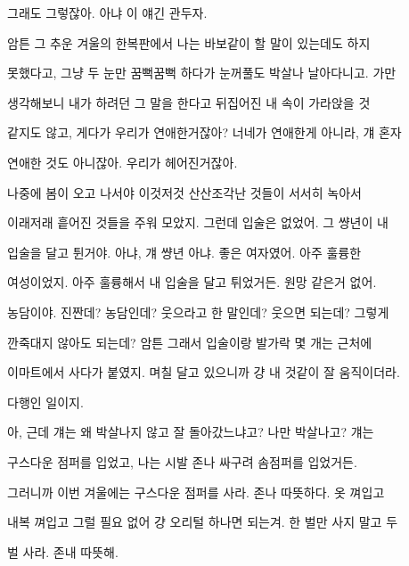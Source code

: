 그래도 그렇잖아. 아냐 이 얘긴 관두자.



암튼 그 추운 겨울의 한복판에서 나는 바보같이 할 말이 있는데도 하지

못했다고, 그냥 두 눈만 꿈뻑꿈뻑 하다가 눈꺼풀도 박살나 날아다니고. 가만

생각해보니 내가 하려던 그 말을 한다고 뒤집어진 내 속이 가라앉을 것

같지도 않고, 게다가 우리가 연애한거잖아? 너네가 연애한게 아니라, 걔 혼자

연애한 것도 아니잖아. 우리가 헤어진거잖아.



나중에 봄이 오고 나서야 이것저것 산산조각난 것들이 서서히 녹아서

이래저래 흩어진 것들을 주워 모았지. 그런데 입술은 없었어. 그 썅년이 내

입술을 달고 튄거야. 아냐, 걔 썅년 아냐. 좋은 여자였어. 아주 훌륭한

여성이었지. 아주 훌륭해서 내 입술을 달고 튀었거든. 원망 같은거 없어.

농담이야. 진짠데? 농담인데? 웃으라고 한 말인데? 웃으면 되는데? 그렇게

깐죽대지 않아도 되는데? 암튼 그래서 입술이랑 발가락 몇 개는 근처에

이마트에서 사다가 붙였지. 며칠 달고 있으니까 걍 내 것같이 잘 움직이더라.

다행인 일이지.



아, 근데 걔는 왜 박살나지 않고 잘 돌아갔느냐고? 나만 박살나고? 걔는

구스다운 점퍼를 입었고, 나는 시발 존나 싸구려 솜점퍼를 입었거든.

그러니까 이번 겨울에는 구스다운 점퍼를 사라. 존나 따뜻하다. 옷 껴입고

내복 껴입고 그럴 필요 없어 걍 오리털 하나면 되는겨. 한 벌만 사지 말고 두

벌 사라. 존내 따뜻해.

